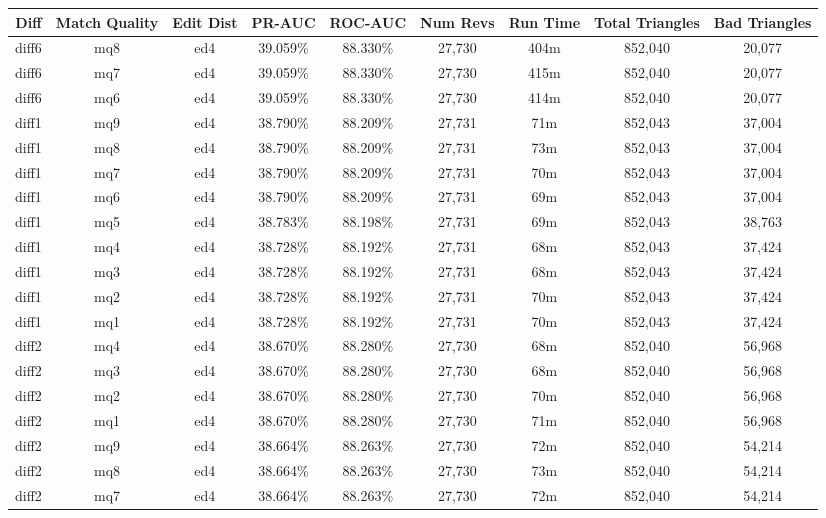 \begin{sidewaystable}[!ph]
  \begin{center}
    \begin{tabular}{|c|c|c||c|c||c|c|c|c|}
\hline
Diff & Match Quality & Edit Dist
        & PR-AUC & ROC-AUC
        & Num Revs & Run Time
        & Total Triangles & Bad Triangles \\
\hline
\hline
diff6 & mq8 & ed4 & 39.059\% & 88.330\% & 27,730 & 404m & 852,040 & 20,077 \\
diff6 & mq7 & ed4 & 39.059\% & 88.330\% & 27,730 & 415m & 852,040 & 20,077 \\
diff6 & mq6 & ed4 & 39.059\% & 88.330\% & 27,730 & 414m & 852,040 & 20,077 \\
diff1 & mq9 & ed4 & 38.790\% & 88.209\% & 27,731 & 71m & 852,043 & 37,004 \\
diff1 & mq8 & ed4 & 38.790\% & 88.209\% & 27,731 & 73m & 852,043 & 37,004 \\
diff1 & mq7 & ed4 & 38.790\% & 88.209\% & 27,731 & 70m & 852,043 & 37,004 \\
diff1 & mq6 & ed4 & 38.790\% & 88.209\% & 27,731 & 69m & 852,043 & 37,004 \\
diff1 & mq5 & ed4 & 38.783\% & 88.198\% & 27,731 & 69m & 852,043 & 38,763 \\
diff1 & mq4 & ed4 & 38.728\% & 88.192\% & 27,731 & 68m & 852,043 & 37,424 \\
diff1 & mq3 & ed4 & 38.728\% & 88.192\% & 27,731 & 68m & 852,043 & 37,424 \\
diff1 & mq2 & ed4 & 38.728\% & 88.192\% & 27,731 & 70m & 852,043 & 37,424 \\
diff1 & mq1 & ed4 & 38.728\% & 88.192\% & 27,731 & 70m & 852,043 & 37,424 \\
diff2 & mq4 & ed4 & 38.670\% & 88.280\% & 27,730 & 68m & 852,040 & 56,968 \\
diff2 & mq3 & ed4 & 38.670\% & 88.280\% & 27,730 & 68m & 852,040 & 56,968 \\
diff2 & mq2 & ed4 & 38.670\% & 88.280\% & 27,730 & 70m & 852,040 & 56,968 \\
diff2 & mq1 & ed4 & 38.670\% & 88.280\% & 27,730 & 71m & 852,040 & 56,968 \\
diff2 & mq9 & ed4 & 38.664\% & 88.263\% & 27,730 & 72m & 852,040 & 54,214 \\
diff2 & mq8 & ed4 & 38.664\% & 88.263\% & 27,730 & 73m & 852,040 & 54,214 \\
diff2 & mq7 & ed4 & 38.664\% & 88.263\% & 27,730 & 72m & 852,040 & 54,214 \\

\end{tabular}
\end{center}
\end{sidewaystable}
